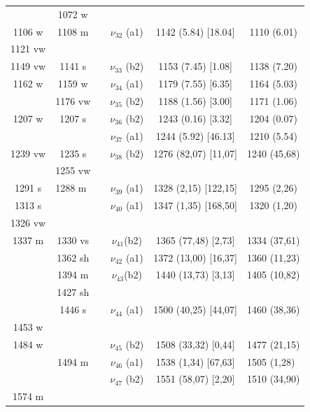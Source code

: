 \begin{table}[H]
\begin{center}
\begin{threeparttable}
\begin{tabular}{c c c c c c}
	 & 1072 w &  &  &  &  \\ 
	 1106 w & 1108 m &  & $\nu_{32}$ (a1) & 1142 (5.84) [18.04] & 1110 (6.01) \\ 
	 1121 vw &  &  &  &  &  \\ 
	 1149 vw & 1141 s	 &  & $\nu_{33}$ (b2)
	 & 1153 (7.45) [1.08] & 1138 (7.20) \\ 
	 1162 w & 1159 w &  & \multicolumn{1}{c}{$\nu_{34}$ (a1)} & 1179 (7.55) [6.35] & 1164 (5.03) \\ 
	 & 1176 vw &  & $\nu_{35}$ (b2) & 1188 (1.56) [3.00] & 1171 (1.06)	 \\ 
	 1207 w & 1207 s &  & $\nu_{36}$ (b2) & 1243 (0.16) [3.32]& 1204 (0.07) \\
	   &   &   & $\nu_{37}$ (a1) & 1244 (5.92) [46.13] & 1210 (5.54)	 \\
	
	1239 vw & 1235 s&  & $\nu_{38}$ (b2)& 1276 (82,07) [11,07] & \multicolumn{1}{l}{  1240 (45,68)	} \\ 
	& 1255 vw &  &  &  & \multicolumn{1}{l}{} \\ 
	1291 s & \multicolumn{1}{l}{      1288 m} &  &       $\nu_{39}$ (a1)
	& 1328 (2,15) [122,15] & 1295 (2,26)
	\\ 
	1313 s &  &  & \multicolumn{1}{c}{$\nu_{40}$ (a1)} & 1347 (1,35) [168,50] & 1320 (1,20) \\ 
	1326 vw &  &  & \multicolumn{1}{c}{} &  &  \\ 
	1337 m & 1330 vs &  &  $\nu_{41}$(b2)
	& 1365 (77,48) [2,73] & 1334 (37,61)
	\\ 
	& 1362 sh	&  &  $\nu_{42}$ (a1)	& 1372 (13,00) [16,37] &  1360 (11,23) \\ 
	& 1394 m&  & \multicolumn{1}{c}{$\nu_{43}$(b2)	} & 1440 (13,73) [3,13] &  1405 (10,82)
	\\ 
	& 1427 sh &  &  &  &  \\ 
	& 1446 s&  &       $\nu_{44}$ (a1)	& 1500 (40,25) [44,07] &  1460 (38,36)
	\\ 
	1453 w &  &  &  &  &  \\ 
	1484 w &  &  &  $\nu_{45}$ (b2) & 1508 (33,32) [0,44] & 1477 (21,15) \\ 
	& 1494 m &  &  $\nu_{46}$ (a1) & 1538 (1,34) [67,63] & \multicolumn{1}{l}{   1505 (1,28)} \\ 
	&  &  &      $\nu_{47}$ (b2) & 1551 (58,07) [2,20] & 1510 (34,90) \\ 
	1574 m &  &  &  &  & \multicolumn{1}{l}{} \\
	

\end{tabular}
\end{threeparttable}
\end{center}
\end{table}
